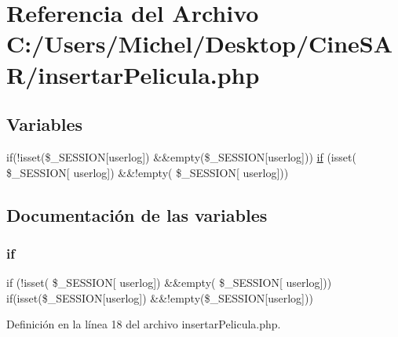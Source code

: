 \hypertarget{insertar_pelicula_8php}{}\section{Referencia del Archivo C\+:/\+Users/\+Michel/\+Desktop/\+Cine\+S\+A\+R/insertar\+Pelicula.php}
\label{insertar_pelicula_8php}
\subsection*{Variables}
\begin{DoxyCompactItemize}
\item 
if(!isset(\$\+\_\+\+S\+E\+S\+S\+I\+ON\mbox{[}\textquotesingle{}userlog\textquotesingle{}\mbox{]}) \&\&empty(\$\+\_\+\+S\+E\+S\+S\+I\+ON\mbox{[}\textquotesingle{}userlog\textquotesingle{}\mbox{]})) \mbox{\hyperlink{insertar_pelicula_8php_aa2baf0eb3a55cfb2103c03399175c1e4}{if}} (isset( \$\+\_\+\+S\+E\+S\+S\+I\+ON\mbox{[} \textquotesingle{}userlog\textquotesingle{}\mbox{]}) \&\&!empty( \$\+\_\+\+S\+E\+S\+S\+I\+ON\mbox{[} \textquotesingle{}userlog\textquotesingle{}\mbox{]}))
\end{DoxyCompactItemize}


\subsection{Documentación de las variables}
\mbox{\label{insertar_pelicula_8php_aa2baf0eb3a55cfb2103c03399175c1e4}} 
\subsubsection{\texorpdfstring{if}{if}}
{\footnotesize\ttfamily if (!isset( \$\+\_\+\+S\+E\+S\+S\+I\+ON\mbox{[} \textquotesingle{}userlog\textquotesingle{}\mbox{]}) \&\&empty( \$\+\_\+\+S\+E\+S\+S\+I\+ON\mbox{[} \textquotesingle{}userlog\textquotesingle{}\mbox{]})) if(isset(\$\+\_\+\+S\+E\+S\+S\+I\+ON\mbox{[}\textquotesingle{}userlog\textquotesingle{}\mbox{]}) \&\&!empty(\$\+\_\+\+S\+E\+S\+S\+I\+ON\mbox{[}\textquotesingle{}userlog\textquotesingle{}\mbox{]}))}



Definición en la línea 18 del archivo insertar\+Pelicula.\+php.

